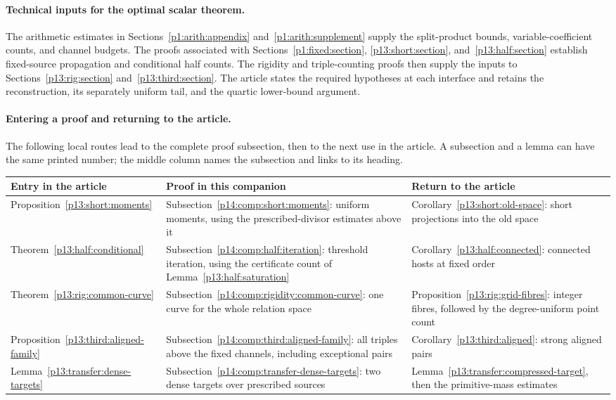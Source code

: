 \paragraph{Technical inputs for the optimal scalar theorem.}
The arithmetic estimates in Sections~\ref{p1:arith:appendix}
and~\ref{p1:arith:supplement} supply the split-product bounds,
variable-coefficient counts, and channel budgets. The proofs
associated with Sections~\ref{p1:fixed:section},
\ref{p13:short:section}, and~\ref{p13:half:section} establish
fixed-source propagation and conditional half counts. The
rigidity and triple-counting proofs then supply the inputs to
Sections~\ref{p13:rig:section} and~\ref{p13:third:section}.
The article states the required hypotheses at each interface
and retains the reconstruction, its separately uniform tail,
and the quartic lower-bound argument.

\paragraph{Entering a proof and returning to the article.}
The following local routes lead to the complete proof subsection,
then to the next use in the article. A subsection and a lemma can
have the same printed number; the middle column names the
subsection and links to its heading.

\begin{center}
\small
\begin{tabularx}{\textwidth}{@{}>{\raggedright\arraybackslash}p{}>{\raggedright\arraybackslash}p{}>{\raggedright\arraybackslash}X@{}}
\toprule
Entry in the article & Proof in this companion & Return to the article\\
\midrule
Proposition~\ref{p13:short:moments}
& Subsection~\ref{p14:comp:short:moments}: uniform moments, using
the prescribed-divisor estimates above it
& Corollary~\ref{p13:short:old-space}: short projections into the old space\\[4pt]
Theorem~\ref{p13:half:conditional}
& Subsection~\ref{p14:comp:half:iteration}: threshold iteration,
using the certificate count of Lemma~\ref{p13:half:saturation}
& Corollary~\ref{p13:half:connected}: connected hosts at fixed order\\[4pt]
Theorem~\ref{p13:rig:common-curve}
& Subsection~\ref{p14:comp:rigidity:common-curve}: one curve for
the whole relation space
& Proposition~\ref{p13:rig:grid-fibres}: integer fibres, followed
by the degree-uniform point count\\[4pt]
Proposition~\ref{p13:third:aligned-family}
& Subsection~\ref{p14:comp:third:aligned-family}: all triples above
the fixed channels, including exceptional pairs
& Corollary~\ref{p13:third:aligned}: strong aligned pairs\\[4pt]
Lemma~\ref{p13:transfer:dense-targets}
& Subsection~\ref{p14:comp:transfer-dense-targets}: two dense targets
over prescribed sources
& Lemma~\ref{p13:transfer:compressed-target}, then the primitive-mass estimates\\
\bottomrule
\end{tabularx}
\end{center}

